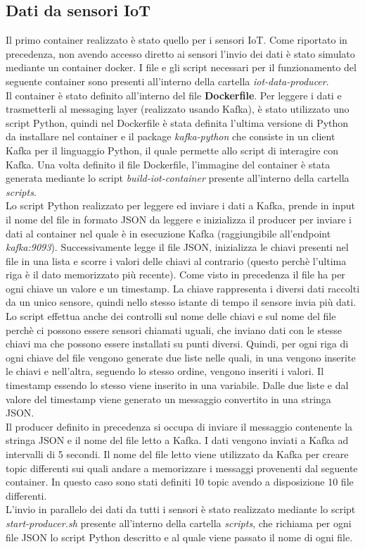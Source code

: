 \documentclass{article}
\begin{document}
\subsection{Dati da sensori IoT}
Il primo container realizzato è stato quello per i sensori IoT. Come riportato in precedenza, non avendo accesso diretto ai sensori l'invio dei dati è stato simulato mediante un container docker. I file e gli script necessari per il funzionamento del seguente container sono presenti all'interno della cartella \textit{iot-data-producer}.\\
Il container è stato definito all'interno del file \textbf{Dockerfile}. Per leggere i dati e trasmetterli al messaging layer (realizzato usando Kafka), è stato utilizzato uno script Python, quindi nel Dockerfile è stata definita l'ultima versione di Python da installare nel container e il package \textit{kafka-python} che consiste in un client Kafka per il linguaggio Python, il quale permette allo script di interagire con Kafka.
Una volta definito il file Dockerfile, l'immagine del container è stata generata mediante lo script \textit{build-iot-container} presente all'interno della cartella \textit{scripts}.\\
Lo script Python realizzato per leggere ed inviare i dati a Kafka, prende in input il nome del file in formato JSON da leggere e inizializza il producer per inviare i dati al container nel quale è in esecuzione Kafka (raggiungibile all'endpoint \textit{kafka:9093}). Successivamente legge il file JSON, inizializza le chiavi presenti nel file in una lista e scorre i valori delle chiavi al contrario (questo perchè l'ultima riga è il dato memorizzato più recente). Come visto in precedenza il file ha per ogni chiave un valore e un timestamp. La chiave rappresenta i diversi dati raccolti da un unico sensore, quindi nello stesso istante di tempo il sensore invia più dati. Lo script effettua anche dei controlli sul nome delle chiavi e sul nome del file perchè ci possono essere sensori chiamati uguali, che inviano dati con le stesse chiavi ma che possono essere installati su punti diversi. Quindi, per ogni riga di ogni chiave del file vengono generate due liste nelle quali, in una vengono inserite le chiavi e nell'altra, seguendo lo stesso ordine, vengono inseriti i valori. Il timestamp essendo lo stesso viene inserito in una variabile. Dalle due liste e dal valore del timestamp viene generato un messaggio convertito in una stringa JSON. \\
Il producer definito in precedenza si occupa di inviare il messaggio contenente la stringa JSON e il nome del file letto a Kafka. I dati vengono inviati a Kafka ad intervalli di 5 secondi. Il nome del file letto viene utilizzato da Kafka per creare topic differenti sui quali andare a memorizzare i messaggi provenenti dal seguente container. In questo caso sono stati definiti 10 topic avendo a disposizione 10 file differenti.\\
L'invio in parallelo dei dati da tutti i sensori è stato realizzato mediante lo script \textit{start-producer.sh} presente all'interno della cartella \textit{scripts}, che richiama per ogni file JSON lo script Python descritto e al quale viene passato il nome di ogni file. 
\end{document}
